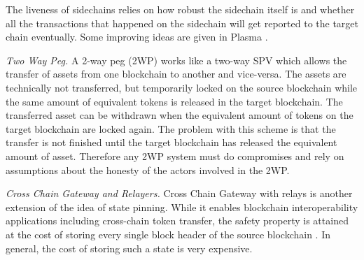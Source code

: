 The liveness of sidechains relies on how robust the sidechain itself is and whether all the transactions that happened on the sidechain will get reported to the target chain eventually. Some improving ideas are given in Plasma \cite{poon2017plasma}.

\smallskip\noindent\emph{Two Way Peg.}
A 2-way peg (2WP) works like a two-way SPV which allows the transfer of assets from one blockchain to another and vice-versa. The assets are technically not transferred, but temporarily locked on the source blockchain while the same amount of equivalent tokens is released in the target blockchain. The transferred asset can be withdrawn when the equivalent amount of tokens on the target blockchain are locked again. The problem with this scheme is that the transfer is not finished until the target blockchain has released the equivalent amount of asset. Therefore any 2WP system must do compromises and rely on assumptions about the honesty of the actors involved in the 2WP.

\smallskip\noindent\emph{Cross Chain Gateway and Relayers.}
Cross Chain Gateway with relays is another extension of the idea of state pinning. While it enables blockchain interoperability applications including cross-chain token transfer, the safety property is attained at the cost of storing every single block header of the source blockchain \cite{belchior2021survey}. In general, the cost of storing such a state is very expensive.\\


